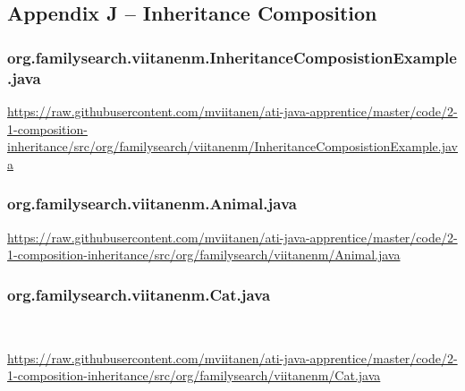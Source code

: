 \subsection*{Appendix J -- Inheritance Composition} \label{App:AppendixJ}

\subsubsection*{org.familysearch.viitanenm.InheritanceComposistionExample.java}
\noindent
\begin{minipage}{.6in}
\end{minipage}
\begin{minipage}{6in}
  \url{https://raw.githubusercontent.com/mviitanen/ati-java-apprentice/master/code/2-1-composition-inheritance/src/org/familysearch/viitanenm/InheritanceComposistionExample.java}
\end{minipage}

\vspace{1em}
\subsubsection*{org.familysearch.viitanenm.Animal.java}
\noindent
\begin{minipage}{.6in}
\end{minipage}
\begin{minipage}{6in}
  \url{https://raw.githubusercontent.com/mviitanen/ati-java-apprentice/master/code/2-1-composition-inheritance/src/org/familysearch/viitanenm/Animal.java}
\end{minipage}

\vspace{1em}
\subsubsection*{org.familysearch.viitanenm.Cat.java}\
\noindent
\begin{minipage}{.6in}
\end{minipage}
\begin{minipage}{6in}
  \url{https://raw.githubusercontent.com/mviitanen/ati-java-apprentice/master/code/2-1-composition-inheritance/src/org/familysearch/viitanenm/Cat.java}
\end{minipage}

